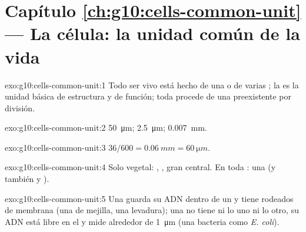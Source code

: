 \section*{Capítulo \ref{ch:g10:cells-common-unit} --- La célula: la unidad común de la vida}

\begin{solution}{exo:g10:cells-common-unit:1}
Todo ser vivo está hecho de una o de varias ; la  es la
unidad básica de estructura y de función; toda  procede de una
 preexistente por división.
\end{solution}

\begin{solution}{exo:g10:cells-common-unit:2}
\qty{50}{\micro m}; \qty{2.5}{\micro m}; \qty{0.007}{mm}.
\end{solution}

\begin{solution}{exo:g10:cells-common-unit:3}
$36/600 = \qty{0.06}{mm} = \qty{60}{\micro m}$.
\end{solution}

\begin{solution}{exo:g10:cells-common-unit:4}
Solo vegetal: , , gran  central. En
toda : una  (y también  y
).
\end{solution}

\begin{solution}{exo:g10:cells-common-unit:5}
Una  guarda su ADN dentro de un  y tiene
 rodeados de membrana (una  de mejilla, una levadura);
una  no tiene ni lo uno ni lo otro, su ADN está libre
en el  y mide alrededor de \qty{1}{\micro m} (una bacteria
como \emph{E. coli}).
\end{solution}

